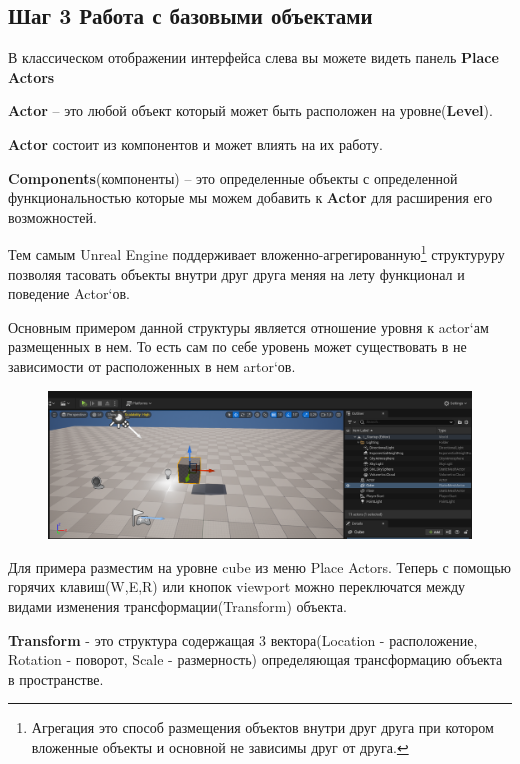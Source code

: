 \newpage

\subsection{Шаг 3 Работа с базовыми объектами}

В классическом отображении интерфейса слева вы можете видеть панель \textbf{Place Actors}

\textbf{Actor} -- это любой объект который может быть расположен на уровне(\textbf{Level}).

\textbf{Actor} состоит из компонентов и может влиять на их работу.

\textbf{Components}(компоненты) -- это определенные объекты с определенной функциональностью которые мы можем добавить к \textbf{Actor} для расширения его возможностей. 

Тем самым Unreal Engine поддерживает вложенно-агрегированную\footnote{Агрегация это способ размещения объектов внутри друг друга при котором вложенные объекты и основной не зависимы друг от друга.} структуруру позволяя тасовать объекты внутри друг друга меняя на лету функционал и поведение Actor`ов.

Основным примером данной структуры является отношение уровня к actor`ам размещенных в нем.
То есть сам по себе уровень может существовать в не зависимости от расположенных в нем artor`ов.


\begin{figure}[h]
    \centering
    \includegraphics*[width = \textwidth]{Lections/LevelAgrigation.png}
\end{figure}

Для примера разместим на уровне cube из меню Place Actors. Теперь с помощью горячих клавиш(W,E,R) или кнопок viewport можно переключатся между видами изменения трансформации(Transform) объекта.

\textbf{Transform} - это структура содержащая 3 вектора(Location - расположение, Rotation - поворот, Scale - размерность) определяющая трансформацию объекта в пространстве.

